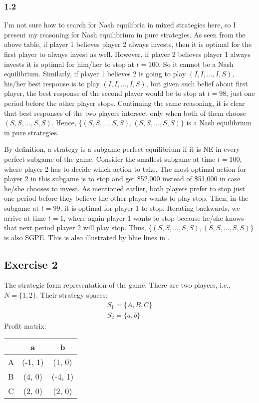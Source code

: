 \documentclass[]{article}
\begin{document}
\subsubsection*{1.2}
I'm not sure how to search for Nash equilibria in mixed strategies here, so I present my reasoning for Nash equilibrium in pure strategies. As seen from the above table, if player 1 believes player 2 always invests, then it is optimal for the first player to always invest as well. However, if player 2 believes player 1 always invests it is optimal for him/her to stop at $t = 100$. So it cannot be a Nash equilibrium. Similarly, if player 1 believes 2 is going to play $(I, I, ..., I, S)$, his/her best response is to play $(I, I, ..., I, S)$, but given such belief about first player, the best response of the second player would be to stop at $t=98$, just one period before the other player stops. Continuing the same reasoning, it is clear that best responses of the two players intersect only when both of them choose $(S, S, ..., S, S)$. Hence, $\{(S, S, ..., S, S), (S, S, ..., S, S)\}$ is a Nash equilibrium in pure strategies.

By definition, a strategy is a subgame perfect equilibrium if it is NE in every perfect subgame of the game. Consider the smallest subgame at time $t=100$, where player 2 has to decide which action to take. The most optimal action for player 2 in this subgame is to stop and get \$52,000 instead of \$51,000 in case he/she chooses to invest. As mentioned earlier, both players prefer to stop just one period before they believe the other player wants to play stop. Then, in the subgame at $t=99$, it is optimal for player 1 to stop. Iterating backwards, we arrive at time $t = 1$, where again player 1 wants to stop because he/she knows that next period player 2 will play stop. Thus, $\{(S, S, ..., S, S), (S, S, ..., S, S)\}$ is also SGPE. This is also illustrated by blue lines in .

\subsection*{Exercise 2}

The strategic form representation of the game.
There are two players, i.e., $N = \{1, 2\}$. Their strategy spaces:
\begin{equation}
	\begin{split}
		S_1 = \{A, B, C\} \\ \nonumber
		S_2 = \{a, b\}
	\end{split}
\end{equation}
Profit matrix:
\begin{table}[h]
	\centering
	\begin{tabular}{c|cc}
		& a       & b       \\ \hline
		\makebox[0pt][l]{\rule[0.15cm]{0.2\textwidth}{0.7pt}}
		A & (-1, 1) & (1, 0)  \\
		B & (4, 0)  & (-4, 1) \\
		C & (2, 0)  & (2, 0) 
	\end{tabular}
\end{table}
\end{document}
